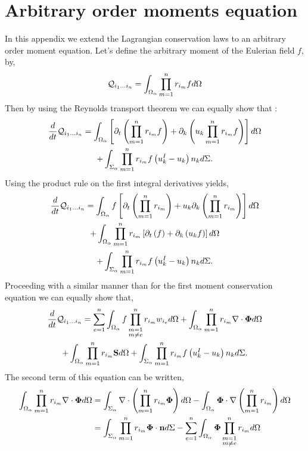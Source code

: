 
\section{Arbitrary order moments equation}
\label{ap:Moments_equations}
In this appendix we extend the Lagrangian conservation laws to an arbitrary order moment equation. 
Let's define the arbitrary moment of the Eulerian field $f$, by, 
\begin{equation*}
    \mathcal{Q}_{i_1\ldots i_n}
    = \int_{\Omega_\alpha} 
    \prod_{m=1}^{n} r_{i_m} f d\Omega
\end{equation*}
Then by using the Reynolds transport theorem we can equally show that :
\begin{multline*}
    \frac{d}{d t} \mathcal{Q}_{i_1\ldots i_n}
    =\int_{\Omega_\alpha} \left[ \partial_t \left(\prod_{m=1}^{n} r_{i_m}f\right) 
    + \partial_k \left(u_k \prod_{m=1}^{n} r_{i_m}f\right) \right]d\Omega\\
    +\int_{\Sigma_\alpha} \prod_{m=1}^{n} r_{i_m} f \left(u^I_k - u_k\right) n_k d\Sigma.
\end{multline*}
Using the product rule on the first integral derivatives yields, 
\begin{multline*}
    \frac{d}{d t} \mathcal{Q}_{i_1\ldots i_n}
    =\int_{\Omega_\alpha} f \left[ \partial_t \left(\prod_{m=1}^{n} r_{i_m}\right) 
    + u_k \partial_k \left( \prod_{m=1}^{n} r_{i_m}\right) \right]d\Omega\\
    +\int_{\Omega_\alpha} \prod_{m=1}^{n} r_{i_m} \left[ \partial_t \left(f\right) 
    +  \partial_k \left(u_k f \right) \right]d\Omega\\
    +\int_{\Sigma_\alpha} \prod_{m=1}^{n} r_{i_m} f \left(u^I_k - u_k\right) n_k d\Sigma.
\end{multline*}
Proceeding with a similar manner than for the first moment conservation equation we can equally show that, 
\begin{multline*}
    \frac{d}{d t} \mathcal{Q}_{i_1\ldots i_n}
    = \sum_{e=1}^{n} \int_{\Omega_\alpha} f  \prod^{n}_{\substack{ m=1 \\   m \neq e}} r_{i_m} w_{i_e}d\Omega
    +\int_{\Omega_\alpha} \prod_{m=1}^{n} r_{i_m} \mathbf{\nabla}\cdot\mathbf{\Phi} d\Omega\\
    + \int_{\Omega_\alpha} \prod_{m=1}^{n} r_{i_m} \textbf{S} d\Omega
    +\int_{\Sigma_\alpha} \prod_{m=1}^{n} r_{i_m} f \left(u^I_k - u_k\right) n_k d\Sigma.
\end{multline*}
The second term of this equation can be written,
\begin{align*}
    \int_{\Omega_\alpha} \prod_{m=1}^{n} r_{i_m} \mathbf{\nabla}\cdot\mathbf{\Phi} d\Omega
    &= \int_{\Sigma_\alpha} \mathbf{\nabla}\cdot \left(\prod_{m=1}^{n} r_{i_m} \mathbf{\Phi} \right)d\Omega
    - \int_{\Omega_\alpha} \mathbf{\Phi} \cdot \mathbf{\nabla} \left(\prod_{m=1}^{n} r_{i_m} \right)d\Omega\\
    &= \int_{\Sigma_\alpha} \prod_{m=1}^{n} r_{i_m} \mathbf{\Phi} \cdot \textbf{n}d\Sigma
    -\sum_{e=1}^{n} \int_{\Omega_\alpha} \mathbf{\Phi}  \prod^{n}_{\substack{ m=1 \\m \neq e}} r_{i_m}  d\Omega
\end{align*}

